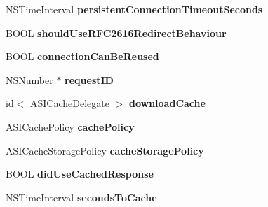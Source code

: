 \begin{DoxyCompactItemize}
\item 
\hypertarget{interface_a_s_i_h_t_t_p_request_a88a193e9b5c9dd228b2231f1988bf9af}{
\-N\-S\-Time\-Interval {\bfseries persistent\-Connection\-Timeout\-Seconds}}
\label{interface_a_s_i_h_t_t_p_request_a88a193e9b5c9dd228b2231f1988bf9af}

\item 
\hypertarget{interface_a_s_i_h_t_t_p_request_a230f9a6925ada0e5f004bb94e3eb0186}{
\-B\-O\-O\-L {\bfseries should\-Use\-R\-F\-C2616\-Redirect\-Behaviour}}
\label{interface_a_s_i_h_t_t_p_request_a230f9a6925ada0e5f004bb94e3eb0186}

\item 
\hypertarget{interface_a_s_i_h_t_t_p_request_ae7896b2999f7f75f33351619ae4d961a}{
\-B\-O\-O\-L {\bfseries connection\-Can\-Be\-Reused}}
\label{interface_a_s_i_h_t_t_p_request_ae7896b2999f7f75f33351619ae4d961a}

\item 
\hypertarget{interface_a_s_i_h_t_t_p_request_a4932fe9248bd331e3aabe5bb4c5328bb}{
\-N\-S\-Number $\ast$ {\bfseries request\-I\-D}}
\label{interface_a_s_i_h_t_t_p_request_a4932fe9248bd331e3aabe5bb4c5328bb}

\item 
\hypertarget{interface_a_s_i_h_t_t_p_request_afde20f3ad80807d0ad1877ff9d574ce1}{
id$<$ \hyperlink{protocol_a_s_i_cache_delegate-p}{\-A\-S\-I\-Cache\-Delegate} $>$ {\bfseries download\-Cache}}
\label{interface_a_s_i_h_t_t_p_request_afde20f3ad80807d0ad1877ff9d574ce1}

\item 
\hypertarget{interface_a_s_i_h_t_t_p_request_aeca095f34c7c1a9ac3d04b2b6ac775cd}{
\-A\-S\-I\-Cache\-Policy {\bfseries cache\-Policy}}
\label{interface_a_s_i_h_t_t_p_request_aeca095f34c7c1a9ac3d04b2b6ac775cd}

\item 
\hypertarget{interface_a_s_i_h_t_t_p_request_a9879e87354a0546503747a45a675a56d}{
\-A\-S\-I\-Cache\-Storage\-Policy {\bfseries cache\-Storage\-Policy}}
\label{interface_a_s_i_h_t_t_p_request_a9879e87354a0546503747a45a675a56d}

\item 
\hypertarget{interface_a_s_i_h_t_t_p_request_a330f9adf74ca50c65307491775466107}{
\-B\-O\-O\-L {\bfseries did\-Use\-Cached\-Response}}
\label{interface_a_s_i_h_t_t_p_request_a330f9adf74ca50c65307491775466107}

\item 
\hypertarget{interface_a_s_i_h_t_t_p_request_ad97230765749fe463d941ccab6927043}{
\-N\-S\-Time\-Interval {\bfseries seconds\-To\-Cache}}
\label{interface_a_s_i_h_t_t_p_request_ad97230765749fe463d941ccab6927043}


\end{DoxyCompactItemize}
